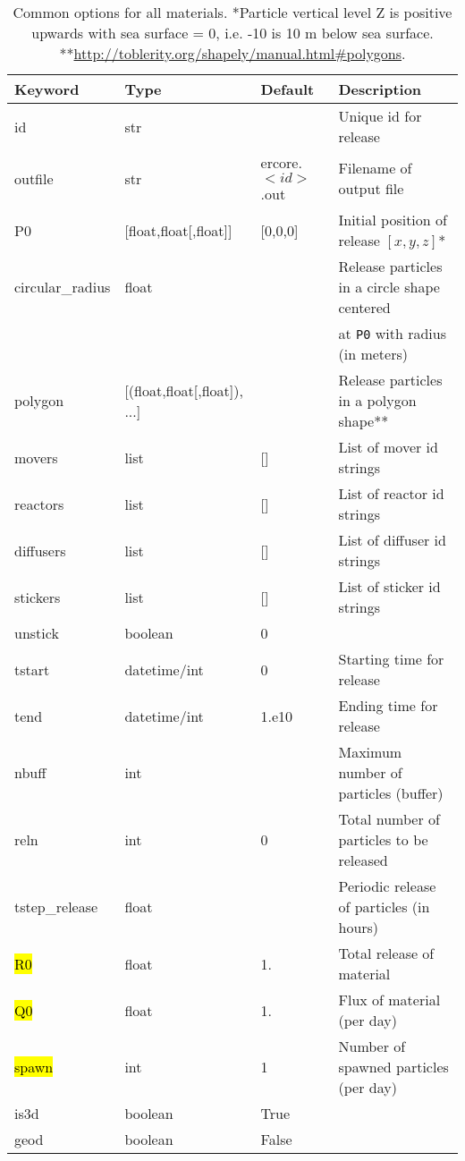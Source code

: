 \documentclass[a4paper]{article}
\begin{document}
\begin{table}[!htp]
\centering
\caption{Common options for all materials. *Particle vertical level Z is positive upwards with sea surface = 0, i.e. -10 is 10 m below sea surface.
**\url{http://toblerity.org/shapely/manual.html\#polygons}.
}
\label{tb:material}
\begin{tabular}{@{}llll@{}}
\toprule
Keyword & Type & Default & Description                         \\ 
\midrule
id          & str  &        & Unique id for release                \\
outfile     & str & ercore.$<id>$.out & Filename of output file \\
P0          & [float,float[,float]] & [0,0,0] & Initial position of release $[x,y,z]$*  \\
circular\_radius & float & & Release particles in a circle shape centered \\
                            & & & at \texttt{P0} with radius (in meters) \\ 
polygon &[(float,float[,float]), ...] & & Release particles in a polygon shape** \\
\midrule
movers      & list & []     & List of mover id strings             \\
reactors    & list & []     & List of reactor id strings \\
diffusers   & list & []     & List of diffuser id strings \\
\midrule
stickers    & list & []     & List of sticker id strings \\
unstick     & boolean & 0     & \\
\midrule
tstart      & datetime/int & 0 & Starting time for release \\
tend        & datetime/int & 1.e10 & Ending time for release \\
nbuff       & int  &       & Maximum number of particles (buffer) \\
reln        & int  & 0     & Total number of particles to be released  \\
tstep\_release & float &   & Periodic release of particles (in hours) \\
\midrule
\hl{R0}          & float & 1. & Total release of material  \\
\hl{Q0}          & float & 1. & Flux of material (per day)  \\
\hl{spawn}       & int & 1 &  Number of spawned particles (per day)  \\

\midrule
is3d        & boolean & True  & \\
geod        & boolean & False  & \\
\bottomrule
\end{tabular}
\end{table}
\FloatBarrier
\end{document}
